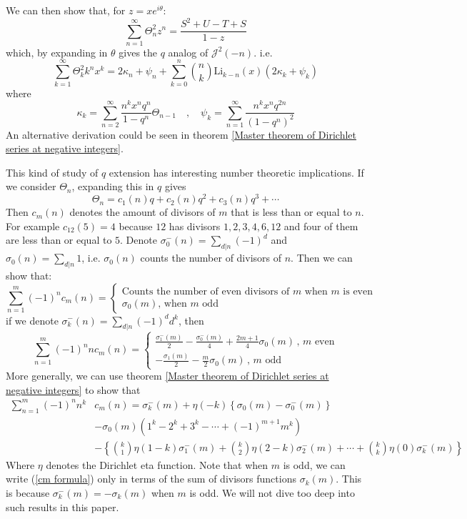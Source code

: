 \documentclass{article}
\begin{document}
We can then show that, for $z=xe^{i\theta}$:
$$\sum_{n=1}^{\infty}\Theta_n ^2z^n=\frac{S^2+U-T+S}{1-z}$$
 which, by expanding in $\theta$ gives the $q$ analog of $\mathcal{J}^2(-n)$. i.e. \begin{equation}\label{Theta 2}
    \sum_{k=1}^{\infty}\Theta_{k}^2k^n x^k=2\kappa_n+\psi_n+\sum_{k=0}^n\binom{n}{k}\mathrm{Li}_{k-n}(x)\left(2\kappa_k+\psi_k\right)
\end{equation}
where
\begin{equation}
    \kappa_k=\sum_{n=2}^{\infty}\frac{n^kx^n q^n}{1-q^n}\Theta_{n-1} \quad ,\quad 
    \psi_k=\sum_{n=1}^{\infty}\frac{n^k x^n q^{2n}}{(1-q^n)^2}
\end{equation}
An alternative derivation could be seen in theorem \ref{Master theorem of Dirichlet series at negative integers}.
\par

This kind of study of $q$ extension has interesting number theoretic implications. If we consider $\Theta_n$,
 expanding this in $q$ gives $$\Theta_n=c_1(n)q+c_2(n)q^2+c_3(n)q^3+\cdots$$ Then $c_m(n)$ denotes the amount of divisors of $m$ that is less than or equal to $n$. For example $c_{12}(5)=4$ because $12$ has divisors $1,2,3,4,6,12$ and four of them are less than or equal to $5$.
 Denote $\sigma_0^{-}(n)=\sum_{d|n}(-1)^d$ and $\sigma_0(n)=\sum_{d|n} 1$, i.e. $\sigma_0(n)$ counts the number of divisors of $n$.
Then we can show that:
$$\sum_{n=1}^m(-1)^n c_m(n)=\begin{cases}\displaystyle
    \text{Counts the number of even divisors of $m$ when $m$ is even} \\
    \displaystyle \text{$\sigma_0(m)$, when $m$ odd}
\end{cases}$$
if we denote $\sigma_k^{-}(n)=\sum_{d|n}(-1)^d d^k $, then $$\sum_{n=1}^m(-1)^n n c_m(n)=\begin{cases}
    \displaystyle \frac{\sigma_1^-(m)}{2}-\frac{\sigma_0^-(m)}{4}+\frac{2m+1}{4}\sigma_0(m) \, ,\, m \text{ even}\\ 
    \displaystyle
    -\frac{\sigma_1(m)}{2}-\frac{m}{2}\sigma_0(m) \, ,\, m \text{ odd} 
\end{cases}$$
More generally, we can use theorem \ref{Master theorem of Dirichlet series at negative integers} to show that 
\begin{equation}\label{cm formula}\begin{split}\sum_{n=1}^m(-1)^n n^k&  c_m(n)= \sigma_k^-(m)+\eta(-k)\left\{\sigma_0(m)-\sigma_0^-(m)\right\}\\ &-\sigma_0(m)\left(1^k-2^k+3^k-\cdots+(-1)^{m+1}m^k\right)\\ &-\left\{\binom{k}{1}\eta(1-k)\sigma_1^-(m)+\binom{k}{2}\eta(2-k)\sigma_2^-(m)+\cdots+\binom{k}{k}\eta(0)\sigma_k^-(m)\right\}\end{split}\end{equation}
Where $\eta$ denotes the Dirichlet eta function. Note that when $m$ is odd, we can write (\ref{cm formula}) only in terms of the sum of divisors functions $\sigma_k(m)$. This is because $\sigma_k^{-}(m)=-\sigma_k(m)$ when $m$ is odd. We will not dive too deep into such results in this paper.
\end{document}

